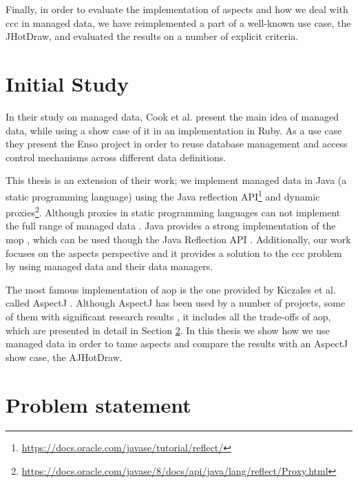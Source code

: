 Finally, in order to evaluate the implementation of aspects and how we deal with \ac{ccc} in managed data, we have reimplemented a part of a well-known use case, the JHotDraw, and evaluated the results on a number of explicit criteria.

\section{Initial Study}\label{Initial Study}
In their study on managed data, Cook et al. \cite{loh2012managed} present the main idea of managed data, while using a show case of it in an implementation in Ruby. As a use case they present the Enso project in order to reuse database management and  access control mechanisms across different data definitions.

This thesis is an extension of their work; we implement managed data in Java (a static programming language) using the Java reflection API\footnote{\url{https://docs.oracle.com/javase/tutorial/reflect/}} and dynamic proxies\footnote{\url{https://docs.oracle.com/javase/8/docs/api/java/lang/reflect/Proxy.html}}. 
Although proxies in static programming languages can not implement the full range of managed data \cite{loh2012managed}. 
Java provides a strong implementation of the \ac{mop} \cite{kiczales1991art}, which can be used though the Java Reflection API \cite{forman2004java}. 
Additionally, our work focuses on the aspects perspective and it provides a solution to the \ac{ccc} problem by using managed data
and their data managers.

The most famous implementation of \ac{aop} is the one provided by Kiczales et al. called AspectJ \cite{kiczales2001overview}. 
Although AspectJ has been used by a number of projects, some of them with significant research results \cite{hannemann2002design} \cite{marinajhotdraw}, it includes all the trade-offs of \ac{aop}, which are presented in detail in Section \ref{Problem statement}. 
In this thesis we show how we use managed data in order to tame aspects and compare the results with an AspectJ show case, the AJHotDraw.

\section{Problem statement}\label{Problem statement}

